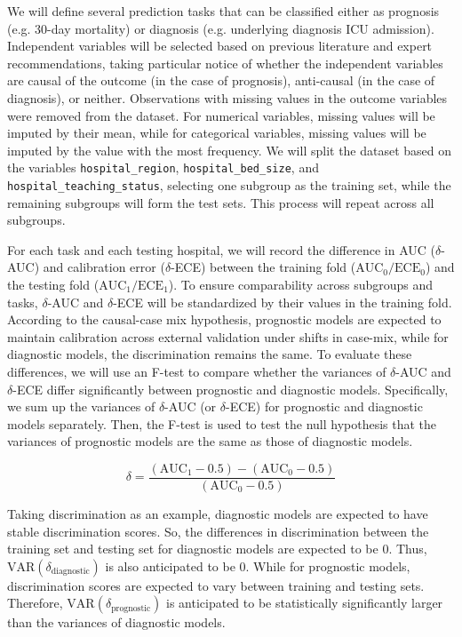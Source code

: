 \documentclass[10.7pt,]{article}
\begin{document}
We will define several prediction tasks that can be classified either as prognosis (e.g. 30-day mortality) or diagnosis (e.g. underlying diagnosis ICU admission). Independent variables will be selected based on previous literature and expert recommendations, taking particular notice of whether the independent variables are causal of the outcome (in the case of prognosis), anti-causal (in the case of diagnosis), or neither. Observations with missing values in the outcome variables were removed from the dataset. For numerical variables, missing values will be imputed by their mean, while for categorical variables, missing values will be imputed by the value with the most frequency. We will split the dataset based on the variables \texttt{hospital\_region}, \texttt{hospital\_bed\_size}, and \texttt{hospital\_teaching\_status}, selecting one subgroup as the training set, while the remaining subgroups will form the test sets. This process will repeat across all subgroups.
  
For each task and each testing hospital, we will record the difference in AUC ($\delta$-AUC) and calibration error ($\delta$-ECE) between the training fold ($\text{AUC}_0 / \text{ECE}_0$) and the testing fold ($\text{AUC}_1 / \text{ECE}_1$). To ensure comparability across subgroups and tasks, $\delta$-AUC and $\delta$-ECE will be standardized by their values in the training fold. According to the causal-case mix hypothesis, prognostic models are expected to maintain calibration across external validation under shifts in case-mix, while for diagnostic models, the discrimination remains the same. To evaluate these differences, we will use an F-test to compare whether the variances of $\delta$-AUC and $\delta$-ECE differ significantly between prognostic and diagnostic models. Specifically, we sum up the variances of $\delta$-AUC (or $\delta$-ECE) for prognostic and diagnostic models separately. Then, the F-test is used to test the null hypothesis that the variances of prognostic models are the same as those of diagnostic models. 
  
\[
\delta = \frac{(\text{AUC}_1 - 0.5) - (\text{AUC}_0 - 0.5)}{(\text{AUC}_0 - 0.5)}
\]
  
Taking discrimination as an example, diagnostic models are expected to have stable discrimination scores. So, the differences in discrimination between the training set and testing set for diagnostic models are expected to be 0. Thus, $\text{VAR}(\delta_{\text{diagnostic}})$ is also anticipated to be 0. While for prognostic models, discrimination scores are expected to vary between training and testing sets. Therefore, $\text{VAR}(\delta_{\text{prognostic}})$ is anticipated to be statistically significantly larger than the variances of diagnostic models.
\end{document}
